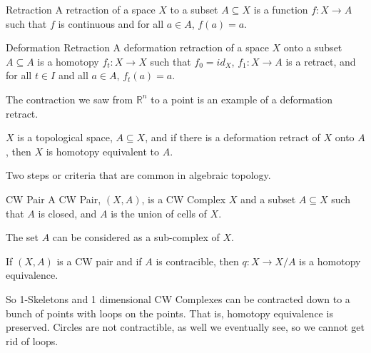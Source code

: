 \documentclass[crop=false,class=book,oneside]{standalone}
\begin{document}
            \begin{ldefinition}{Retraction}
                A retraction of a space $X$ to a subset
                $A\subseteq{X}$ is a function $f:X\rightarrow{A}$
                such that $f$ is continuous and
                for all $a\in{A}$, $f(a)=a$.
            \end{ldefinition}
            \begin{ldefinition}{Deformation Retraction}
                A deformation retraction of a space
                $X$ onto a subset $A\subseteq{A}$ is a homotopy
                $f_{t}:X\rightarrow{X}$ such that $f_{0}=id_{X}$,
                $f_{1}:X\rightarrow{A}$ is a retract, and for
                all $t\in{I}$ and all $a\in{A}$, $f_{t}(a)=a$.
            \end{ldefinition}
            \begin{lexample}
                The contraction we saw from $\mathbb{R}^{n}$ to
                a point is an example of a deformation retract.
            \end{lexample}
            \begin{theorem}
                $X$ is a topological space, $A\subseteq{X}$, and
                if there is a deformation retract of $X$ onto
                $A$, then $X$ is homotopy equivalent to $A$.
            \end{theorem}
            Two steps or criteria that are common in algebraic
            topology.
            \begin{ldefinition}{CW Pair}
                A CW Pair, $(X,A)$, is a CW Complex $X$ and a
                subset $A\subseteq{X}$ such that $A$ is closed,
                and $A$ is the union of cells of $X$.
            \end{ldefinition}
            The set $A$ can be considered as a sub-complex
            of $X$.
            \begin{theorem}
                If $(X,A)$ is a CW pair and if $A$ is
                contracible, then $q:X\rightarrow{X}/A$
                is a homotopy equivalence.
            \end{theorem}
            So 1-Skeletons and 1 dimensional CW Complexes can
            be contracted down to a bunch of points with loops
            on the points. That is, homotopy equivalence is
            preserved. Circles are not contractible, as well
            we eventually see, so we cannot get rid of loops.
\end{document}
